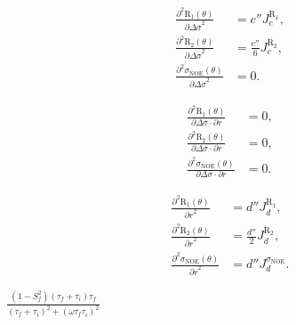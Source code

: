 \documentclass[a4paper,11pt,twoside,openright]{book}
\def\lthtmlcheckvsize{\ifdim\ht\sizebox<\vsize 
  \ifdim\wd\sizebox<\hsize\expandafter\hfill\fi \expandafter\vfill
  \else\expandafter\vss\fi}%
\begin{document}
{\newpage\clearpage
\setcounter{equation}{53}
%
\begin{subequations}\begin{align}
\frac{\partial^2 \mathrm{R}_1(\theta)}{{\partial \Delta\sigma}^2} &= c'' J_c^{\mathrm{R}_1},\\
\frac{\partial^2 \mathrm{R}_2(\theta)}{{\partial \Delta\sigma}^2} &= \frac{c''}{6} J_c^{\mathrm{R}_2},\\
\frac{\partial^2 \sigma_{\scriptscriptstyle \mathrm{NOE}}(\theta)}{{\partial \Delta\sigma}^2} &= 0.\end{align}\end{subequations}%
\lthtmldisplayZ
\lthtmlcheckvsize\clearpage}

{\newpage\clearpage
\setcounter{equation}{54}
%
\begin{subequations}\begin{align}
\frac{\partial^2 \mathrm{R}_1(\theta)}{\partial \Delta\sigma \cdot \partial r} &= 0,\\
\frac{\partial^2 \mathrm{R}_2(\theta)}{\partial \Delta\sigma \cdot \partial r} &= 0,\\
\frac{\partial^2 \sigma_{\scriptscriptstyle \mathrm{NOE}}(\theta)}{\partial \Delta\sigma \cdot \partial r} &= 0.\end{align}\end{subequations}%
\lthtmldisplayZ
\lthtmlcheckvsize\clearpage}

{\newpage\clearpage
\setcounter{equation}{55}
%
\begin{subequations}\begin{align}
\frac{\partial^2 \mathrm{R}_1(\theta)}{{\partial r}^2} &= d'' J_d^{\mathrm{R}_1},\\
\frac{\partial^2 \mathrm{R}_2(\theta)}{{\partial r}^2} &= \frac{d''}{2} J_d^{\mathrm{R}_2},\\
\frac{\partial^2 \sigma_{\scriptscriptstyle \mathrm{NOE}}(\theta)}{{\partial r}^2} &= d'' J_d^{\sigma_{\scriptscriptstyle \mathrm{NOE}}}.\end{align}\end{subequations}%
\lthtmldisplayZ
\lthtmlcheckvsize\clearpage}

{\newpage\clearpage
{}%
$\displaystyle {\frac{{(1 - S^2_f)(\tau_f + \tau_i)\tau_f}}{{(\tau_f + \tau_i)^2 + (\omega \tau_f \tau_i)^2}}}$%
\lthtmlindisplaymathZ
\lthtmlcheckvsize\clearpage}
\end{document}
